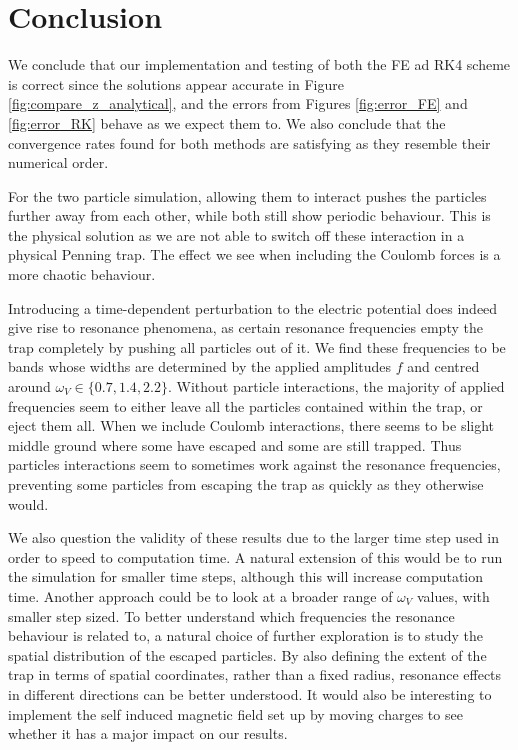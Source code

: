 \section{Conclusion}\label{sec:conclusion}

We conclude that our implementation and testing of both the FE ad RK4 scheme is correct since the solutions appear accurate in Figure \ref{fig:compare_z_analytical}, and the errors from Figures \ref{fig:error_FE} and \ref{fig:error_RK} behave as we expect them to. We also conclude that the convergence rates found for both methods are satisfying as they resemble their numerical order. 


For the two particle simulation, allowing them to interact pushes the particles further away from each other, while both still show periodic behaviour. This is the physical solution as we are not able to switch off these interaction in a physical Penning trap. The effect we see when including the Coulomb forces is a more chaotic behaviour. 

Introducing a time-dependent perturbation to the electric potential does indeed give rise to resonance phenomena, as certain resonance frequencies empty the trap completely by pushing all particles out of it. We find these frequencies to be bands whose widths are determined by the applied amplitudes $f$ and centred around $\omega_V\in\{0.7, 1.4, 2.2\}$. Without particle interactions, the majority of applied frequencies seem to either leave all the particles contained within the trap, or eject them all. When we include Coulomb interactions, there seems to be slight middle ground where some have escaped and some are still trapped. Thus particles interactions seem to sometimes work against the resonance frequencies, preventing some particles from escaping the trap as quickly as they otherwise would. 

We also question the validity of these results due to the larger time step used in order to speed to computation time. A natural extension of this would be to run the simulation for smaller time steps, although this will increase computation time. Another approach could be to look at a broader range of $\omega_V$ values, with smaller step sized. To better understand which frequencies the resonance behaviour is related to, a natural choice of further exploration is to study the spatial distribution of the escaped particles. By also defining the extent of the trap in terms of spatial coordinates, rather than a fixed radius, resonance effects in different directions can be better understood. It would also be interesting to implement the self induced magnetic field set up by moving charges to see whether it has a major impact on our results. 

